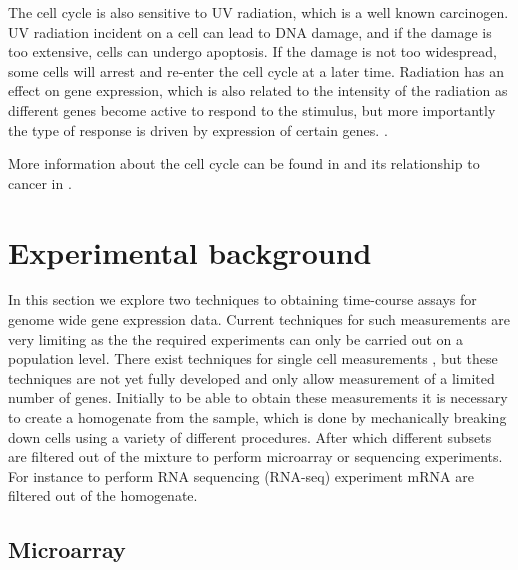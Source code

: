 The cell cycle is also sensitive to UV radiation, which is a well known carcinogen. UV radiation incident on a cell can lead to DNA damage, and if the damage is too extensive, cells can undergo apoptosis. If the damage is not too widespread, some cells will arrest and re-enter the cell cycle at a later time. Radiation has an effect on gene expression, which is also related to the intensity of the radiation as different genes become active to respond to the stimulus, but more importantly the type of response is driven by expression of certain genes. \citep{Gentile:2003in}.

More information about the cell cycle can be found in \citet[Chapter~17]{Alberts:2007tv} and its relationship to cancer in \citet[Chapter~8]{Weinberg:2013uu}.


\section{Experimental background}
\label{sec:exper-backgr}

In this section we explore two techniques to obtaining time-course assays for genome wide gene expression data. Current techniques for such measurements are very limiting as the the required experiments can only be carried out on a population level. There exist techniques for single cell measurements \citep{Buganim:2012hp}, but these techniques are not yet fully developed and only allow measurement of a limited number of genes. Initially to be able to obtain these measurements it is necessary to create a homogenate from the sample, which is done by mechanically breaking down cells using a variety of different procedures.  After which different subsets are filtered out of the mixture to perform microarray or sequencing experiments.  For instance to perform RNA sequencing (RNA-seq) experiment mRNA are filtered out of the homogenate.

\subsection{Microarray}
\label{sec:microarray}

